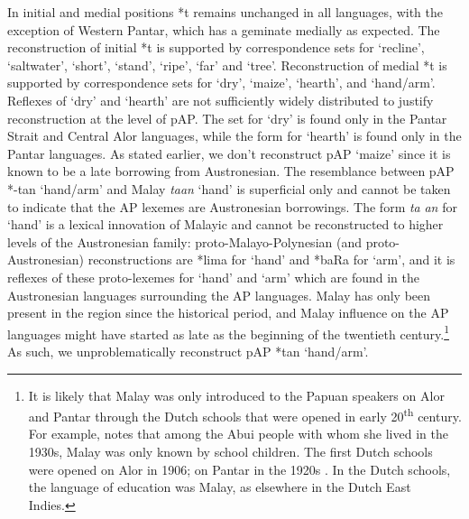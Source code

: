 In initial and medial positions *t remains unchanged in all languages, with the exception of Western Pantar, which has a geminate medially as expected. The reconstruction of initial *t is supported by correspondence sets for `recline', `saltwater', `short', `stand', `ripe', `far' and `tree'. Reconstruction of medial *t is supported by correspondence sets for `dry', `maize', `hearth', and `hand/arm'. Reflexes of `dry' and `hearth' are not sufficiently widely distributed to justify reconstruction at the level of pAP. The set for `dry' is found only in the Pantar Strait and Central Alor languages, while the form for `hearth' is found only in the Pantar languages. As stated earlier, we don't reconstruct pAP `maize' since it is known to be a late borrowing from Austronesian. The resemblance between pAP *-tan `hand/arm' and Malay \textit{ta}\textit{{\ng}}\textit{an} `hand' is superficial only and cannot be taken to indicate that the AP lexemes are Austronesian borrowings. The form \textit{ta}\textit{{\ng}}\textit{
an} for `hand' is a lexical innovation of Malayic and cannot be reconstructed to higher levels of the Austronesian family: proto-Malayo-Polynesian (and proto-Austronesian) reconstructions are *lima for `hand' and *baRa for `arm', and it is reflexes of these proto-lexemes for `hand' and `arm' which are found in the Austronesian languages surrounding the AP languages. Malay has only been present in the region since the historical period, and Malay influence on the AP languages might have started as late as the beginning of the twentieth century.\footnote{ It is likely that Malay was only introduced to the Papuan speakers on Alor and Pantar through the Dutch schools that were opened in early 20\textsuperscript{th} century. For example, \citet[223]{DuBois1944} notes that among the Abui people with whom she lived in the 1930s, Malay was only known by school children. The first Dutch schools were opened on Alor in 1906; on Pantar in the 1920s \citep[14]{Klamer2010}. In the Dutch schools, 
the language of education was Malay, as elsewhere in the Dutch East Indies.} As such, we unproblematically reconstruct pAP *tan `hand/arm'.

